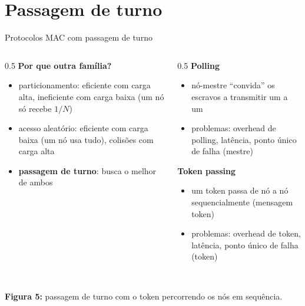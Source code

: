 \documentclass[aspectratio=169,11pt]{beamer}
\begin{document}
\section{Passagem de turno}

\begin{frame}{Protocolos MAC com passagem de turno}
  \begin{columns}
    \begin{column}{0.5\textwidth}
      \textbf{Por que outra família?}
      \begin{itemize}
        \item particionamento: eficiente com carga alta, ineficiente com carga baixa (um nó só recebe $1/N$)
        \item acesso aleatório: eficiente com carga baixa (um nó usa tudo), colisões com carga alta
        \item \textbf{passagem de turno}: busca o melhor de ambos
      \end{itemize}
    \end{column}
    \begin{column}{0.5\textwidth}
      \textbf{Polling}
      \begin{itemize}
        \item nó-mestre ``convida'' os escravos a transmitir um a um
        \item problemas: overhead de polling, latência, ponto único de falha (mestre)
      \end{itemize}
      \textbf{Token passing}
      \begin{itemize}
        \item um token passa de nó a nó sequencialmente (mensagem token)
        \item problemas: overhead de token, latência, ponto único de falha (token)
      \end{itemize}
    \end{column}
  \end{columns}
  \begin{center}
    \\[1mm]
    {\scriptsize \textbf{Figura 5:} passagem de turno com o token percorrendo os nós em sequência.}
  \end{center}
\end{frame}
\end{document}
